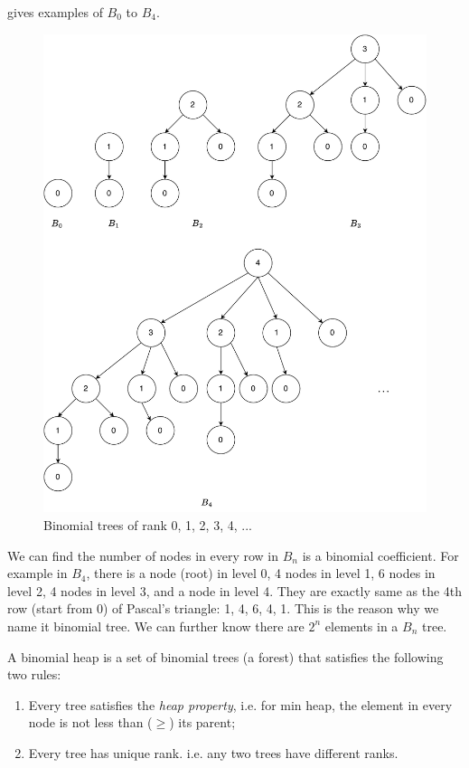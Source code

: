 \documentclass[b5paper]{article}
\begin{document}
 gives examples of $B_0$ to $B_4$.

\begin{figure}[htbp]
  \centering
  \includegraphics[scale=0.45]{img/Bn-trees}
  \caption{Binomial trees of rank 0, 1, 2, 3, 4, ...}
  \label{fig:bitree-forms}
\end{figure}

We can find the number of nodes in every row in $B_n$ is a binomial coefficient. For example in $B_4$, there is a node (root) in level 0, 4 nodes in level 1, 6 nodes in level 2, 4 nodes in level 3, and a node in level 4. They are exactly same as the 4th row (start from 0) of Pascal's triangle: 1, 4, 6, 4, 1. This is the reason why we name it binomial tree. We can further know there are $2^n$ elements in a $B_n$ tree.

\label{Binomial heap} 

A binomial heap is a set of binomial trees (a forest) that satisfies the following two rules:

\begin{enumerate}
\item Every tree satisfies the {\em heap property}, i.e. for min heap, the element in every node is not less than ($\geq$) its parent;
\item Every tree has unique rank. i.e. any two trees have different ranks.
\end{enumerate}
\end{document}
